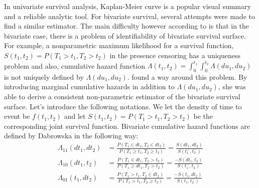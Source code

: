 \documentclass[]{article}
\begin{document}
In univariate survival analysis, Kaplan-Meier curve is a popular visual summary and a reliable analytic tool. For bivariate survival, several attempts were made to find a similar estimator. The main difficulty however according to \cite{kalbfleisch2011statistical} is that in the bivariate case, there is a problem of identifiability of bivariate survival surface. For example, a nonparametric maximum likelihood for a survival function, $S(t_1, t_2) = P(T_1>t_1, T_2>t_2)$ in the presence censoring has a uniqueness problem and also, cumulative hazard function $\Lambda(t_1, t_2) = \int_0^{t_1}\int_0^{t_2}\Lambda(du_1,du_2)$ is not uniquely defined by $\Lambda(du_1,du_2)$.  \cite{dabrowska1988kaplan} found a way around this problem. By introducing marginal cumulative hazards in addition to $\Lambda(du_1,du_2)$, she was able to derive a consistent non-parametric estimator of the bivariate survival surface. Let's introduce the following notations. We let the density of time to event be $f(t_1,t_2)$ and let $S(t_1,t_2) = P(T_1>t_1, T_2>t_2)$ be the corresponding joint survival function. Bivariate cumulative hazard functions are defined by Dabrowska in the following way:
	$$
	\begin{aligned}
		\Lambda_{11}(dt_1,dt_2) &= \frac{P(T_1 \in dt_1, T_2\in dt_2)}{P(T_1 \geq t_1, T_2 \geq t_2)} = \frac{S(dt_1, dt_2)}{S(t_1^-, t_2^-)}\\
		\Lambda_{10}(dt_1,t_2) &= \frac{P(T_1 \in dt_1, T_2 > t_2)}{P(T_1 \geq dt_1, T_2 > t_2)} = \frac{-S(dt_1, t_2)}{S(t_1^-, t_2)}\\ %
		\Lambda_{01}(t_1,dt_2) &= \frac{P(T_1 > t_1, T_2\in dt_2)}{P(T_1 > t_1, T_2 \geq t_2)} = \frac{-S(t_1, dt_2)}{S(t_1, t_2^-)}\\
	\end{aligned}
	$$
\end{document}
